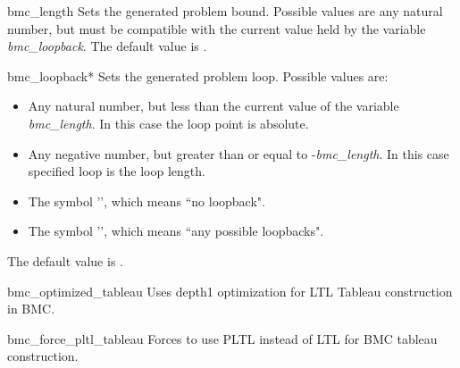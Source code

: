 



\begin{nusmvVar} {bmc\_length}{}{}
Sets the generated problem bound. Possible values are any natural
number, but must be compatible with the current value held by the
variable \emph{bmc\_loopback}. The default value is .
\end{nusmvVar}

\begin{nusmvVar} {bmc\_loopback}{}{*}
Sets the generated problem loop. Possible values are:

\begin{itemize}
\item Any natural number, but less than the current value of
the variable \emph{bmc\_length}. In this case the loop point is absolute.
\item Any negative number, but greater than or equal to
-\emph{bmc\_length}. In this case specified loop is the loop length.
\item The symbol '', which means ``no loopback".
\item The symbol '\varvalue{*}', which means ``any possible loopbacks".
\end{itemize}

The default value is \varvalue{*}.
\end{nusmvVar}

\begin{nusmvVar} {bmc\_optimized\_tableau}{}{}
Uses depth1 optimization for LTL Tableau construction in BMC.
\end{nusmvVar}

\begin{nusmvVar} {bmc\_force\_pltl\_tableau}{}{}
Forces to use PLTL instead of LTL for BMC tableau construction.
\end{nusmvVar}

